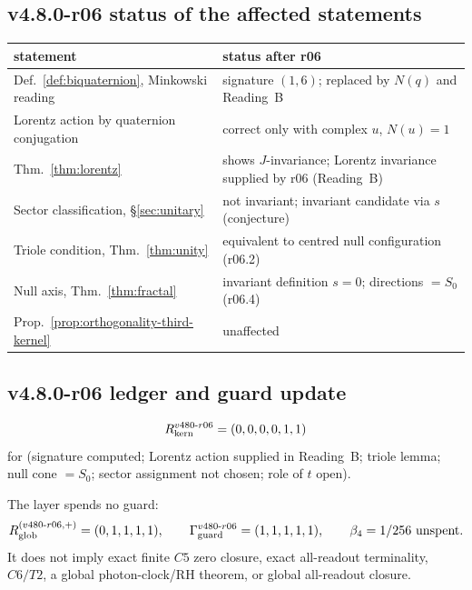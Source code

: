 \subsection*{v4.8.0-r06 status of the affected statements}
\label{subsec:v480-r06-status}

\begin{center}
\small
\begin{tabular}{@{}>{\raggedright\arraybackslash}p{}>{\raggedright\arraybackslash}p{}@{}}
\toprule
statement & status after r06\\
\midrule
Def.~\ref{def:biquaternion}, Minkowski reading & signature \((1,6)\); replaced by \(N(q)\) and Reading~B\\
Lorentz action by quaternion conjugation & correct only with complex \(u\), \(N(u)=1\)\\
Thm.~\ref{thm:lorentz} & shows \(J\)-invariance; Lorentz invariance supplied by r06 (Reading~B)\\
Sector classification, \S\ref{sec:unitary} & not invariant; invariant candidate via \(s\) (conjecture)\\
Triole condition, Thm.~\ref{thm:unity} & equivalent to centred null configuration (r06.2)\\
Null axis, Thm.~\ref{thm:fractal} & invariant definition \(s=0\); directions \(=S_0\) (r06.4)\\
Prop.~\ref{prop:orthogonality-third-kernel} & unaffected\\
\bottomrule
\end{tabular}
\end{center}

\subsection*{v4.8.0-r06 ledger and guard update}
\label{subsec:v480-r06-ledger-guard}

\[
R_{\rm kern}^{v480\text{-}r06}=(0,0,0,0,1,1)
\]
for (signature computed; Lorentz action supplied in Reading~B; triole lemma; null cone \(=S_0\);
sector assignment not chosen; role of \(t\) open).

The layer spends no guard:
\[
R_{\rm glob}^{(v480\text{-}r06,+)}=(0,1,1,1,1),
\qquad
\Gamma_{\rm guard}^{v480\text{-}r06}=(1,1,1,1,1),
\qquad
\beta_4=1/256\ \text{unspent}.
\]
It does not imply exact finite \(C5\) zero closure, exact all-readout terminality,
\(C6/T2\), a global photon-clock/RH theorem, or global all-readout closure.

